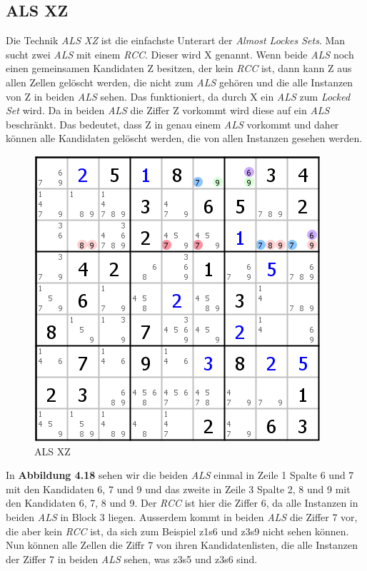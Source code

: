 \newpage
\subsection{ALS XZ}
Die Technik \textit{ALS XZ} ist die einfachste Unterart der \textit{Almost Lockes Sets}. Man sucht zwei \textit{ALS} mit einem \textit{RCC}. Dieser wird X genannt. Wenn beide \textit{ALS} noch einen gemeinsamen Kandidaten Z besitzen, der kein \textit{RCC} ist, dann kann Z aus allen Zellen gelöscht werden, die nicht zum \textit{ALS} gehören und die alle Instanzen von Z in beiden \textit{ALS} sehen. Das funktioniert, da durch X ein \textit{ALS} zum \textit{Locked Set} wird. Da in beiden \textit{ALS} die Ziffer Z vorkommt wird diese auf ein \textit{ALS} beschränkt. Das bedeutet, dass Z in genau einem \textit{ALS} vorkommt und daher können alle Kandidaten gelöscht werden, die von allen Instanzen gesehen werden.

\begin{figure}[h]
\begin{center}
\includegraphics{./img/ALS_XZ.png}
\caption{ALS XZ}
\end{center}
\end{figure}

In \textbf{Abbildung 4.18} sehen wir die beiden \textit{ALS} einmal in Zeile 1 Spalte 6 und 7 mit den Kandidaten 6, 7 und 9 und das zweite in Zeile 3 Spalte 2, 8 und 9 mit den Kandidaten 6, 7, 8 und 9. Der \textit{RCC} ist hier die Ziffer 6, da alle Instanzen in beiden \textit{ALS} in Block 3 liegen. Ausserdem kommt in beiden \textit{ALS} die Ziffer 7 vor, die aber kein \textit{RCC} ist, da sich zum Beispiel z1s6 und z3s9 nicht sehen können. Nun können alle Zellen die Ziffr 7 von ihren Kandidatenlisten, die alle Instanzen der Ziffer 7 in beiden \textit{ALS} sehen, was z3s5 und z3s6 sind.